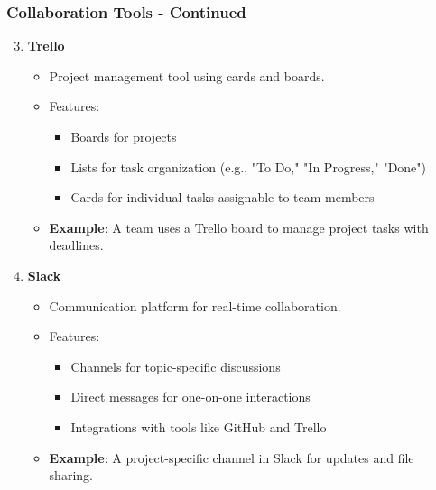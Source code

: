\documentclass[aspectratio=169]{beamer}
\begin{document}
\begin{frame}[fragile]
    \frametitle{Collaboration Tools - Continued}
    \begin{enumerate}
        \setcounter{enumi}{2} %
        \item \textbf{Trello}
            \begin{itemize}
                \item Project management tool using cards and boards.
                \item Features:
                    \begin{itemize}
                        \item Boards for projects
                        \item Lists for task organization (e.g., "To Do," "In Progress," "Done")
                        \item Cards for individual tasks assignable to team members
                    \end{itemize}
                \item \textbf{Example}: A team uses a Trello board to manage project tasks with deadlines.
            \end{itemize}
        
        \item \textbf{Slack}
            \begin{itemize}
                \item Communication platform for real-time collaboration.
                \item Features:
                    \begin{itemize}
                        \item Channels for topic-specific discussions
                        \item Direct messages for one-on-one interactions
                        \item Integrations with tools like GitHub and Trello
                    \end{itemize}
                \item \textbf{Example}: A project-specific channel in Slack for updates and file sharing.
            \end{itemize}
    \end{enumerate}
\end{frame}
\end{document}
